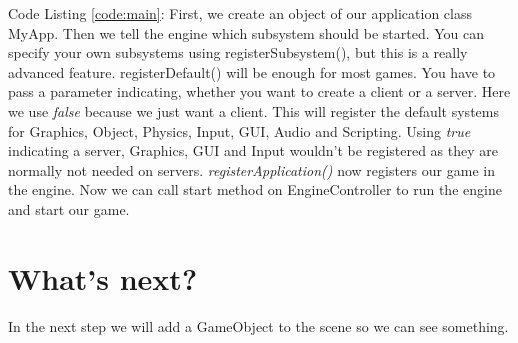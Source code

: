 \documentclass{article}
\begin{document}

Code Listing \ref{code:main}: First, we create an object of our application class MyApp. Then we tell the engine which subsystem should be started. You can specify your own subsystems using registerSubsystem(), but this is a really advanced feature. registerDefault() will be enough for most games. You have to pass a parameter indicating, whether you want to create a client or a server. Here we use \textit{false} because we just want a client. This will register the default systems for Graphics, Object, Physics, Input, GUI, Audio and Scripting. Using \textit{true} indicating a server, Graphics, GUI and Input wouldn't be registered as they are normally not needed on servers. \textit{registerApplication()} now registers our game in the engine. Now we can call start method on EngineController to run the engine and start our game.

\section{What's next?}

In the next step we will add a GameObject to the scene so we can see something.
\end{document}

